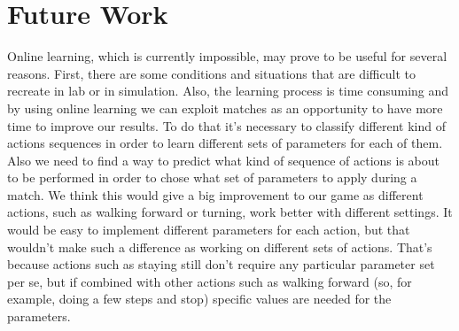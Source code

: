 \documentclass{article}
\begin{document}
\section{Future Work} 
Online learning, which is currently impossible, may prove to be useful for several reasons. First, there are some conditions and situations that are difficult to recreate in lab or in simulation. Also, the learning process is time consuming and by using online learning we can exploit matches as an opportunity to have more time to improve our results. To do that it's necessary to classify different kind of actions sequences in order to learn different sets of parameters for each of them. Also we need to find a way to predict what kind of sequence of actions is about to be performed in order to chose what set of parameters to apply during a match. We think this would give a big improvement to our game as different actions, such as walking forward or turning, work better with different settings. It would be easy to implement different parameters for each action, but that wouldn't make such a difference as working on different sets of actions. That's because actions such as staying still don't require any particular parameter set per se, but if combined with other actions such as walking forward (so, for example, doing a few steps and stop) specific values are needed for the parameters. 





\end{document}
